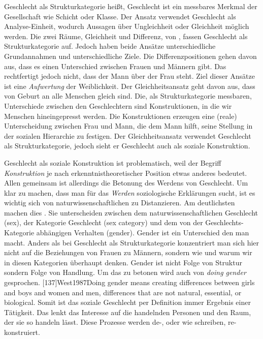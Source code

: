 Geschlecht als Strukturkategorie heißt, Geschlecht ist ein messbares Merkmal der Gesellschaft wie Schicht oder Klasse. Der Ansatz verwendet Geschlecht als Analyse-Einheit, wodurch Aussagen über Ungleichheit oder Gleichheit möglich werden.  Die zwei Räume, Gleichheit und Differenz, von \citeauthor{Nissen1998}, fassen Geschlecht als Strukturkategorie auf. Jedoch haben beide Ansätze unterschiedliche Grundannahmen und unterschiedliche Ziele. 
Die Differenzpositionen gehen davon aus, dass es einen Unterschied zwischen Frauen und Männern gibt. Das rechtfertigt jedoch nicht, dass der Mann über der Frau steht. Ziel dieser Ansätze ist eine \emph{Aufwertung} der Weiblichkeit.
Der Gleichheitsansatz geht davon aus, dass von Geburt an alle Menschen gleich sind. 
Die, als Strukturkategorie messbaren, Unterschiede zwischen den Geschlechtern sind Konstruktionen, in die wir Menschen hineingepresst werden. Die Konstruktionen erzeugen eine (reale) Unterscheidung zwischen Frau und Mann, die dem Mann hilft, seine Stellung in der sozialen Hierarchie zu festigen. \parencite[181]{Hertz2007}
Der Gleichheitsansatz verwendet Geschlecht als Strukturkategorie, jedoch sieht er Geschlecht auch als soziale Konstruktion.

Geschlecht als soziale Konstruktion ist problematisch, weil der Begriff \emph{Konstruktion} je nach erkenntnistheoretischer Position etwas anderes bedeutet. \parencite[219]{Gildemeister2000} Allen gemeinsam ist allerdings die Betonung des Werdens von Geschlecht. Um klar zu machen, dass man für das \emph{Werden} soziologische Erklärungen sucht, ist es wichtig sich von naturwissenschaftlichen zu Distanzieren. Am deutlichsten machen dies . Sie unterscheiden zwischen dem naturwissenschaftlichen Geschlecht (sex), der Kategorie Geschlecht (sex category) und dem von der Geschlechts-Kategorie abhängigen Verhalten (gender). Gender ist ein Unterschied den man macht. Anders als bei Geschlecht als Strukturkategorie konzentriert man sich hier nicht auf die Beziehungen von Frauen zu Männern, sondern wie und warum wir in diesen Kategorien überhaupt denken. Gender ist nicht Folge von Struktur sondern Folge von Handlung. Um das zu betonen wird auch von \emph{doing gender} gesprochen. 
[137]{West1987}{Doing gender means creating differences between girls and boys and women and men, differences that are not natural, essential, or biological.}
Somit ist das soziale Geschlecht per Definition immer Ergebnis einer Tätigkeit. Das lenkt das Interesse auf die handelnden Personen und den Raum, der sie so handeln lässt.
Diese Prozesse werden de-, oder wie  schreiben, re-konstruiert.

